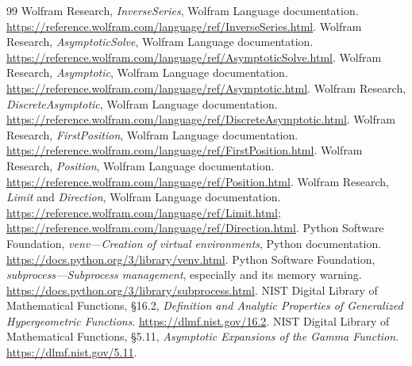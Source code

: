\documentclass[11pt,letterpaper]{article}
\newcommand{\code}[1]{\texttt{\detokenize{#1}}}
\begin{document}
\begin{thebibliography}{99}
 Wolfram Research, \emph{InverseSeries}, Wolfram Language documentation. \url{https://reference.wolfram.com/language/ref/InverseSeries.html}.
 Wolfram Research, \emph{AsymptoticSolve}, Wolfram Language documentation. \url{https://reference.wolfram.com/language/ref/AsymptoticSolve.html}.
 Wolfram Research, \emph{Asymptotic}, Wolfram Language documentation. \url{https://reference.wolfram.com/language/ref/Asymptotic.html}.
 Wolfram Research, \emph{DiscreteAsymptotic}, Wolfram Language documentation. \url{https://reference.wolfram.com/language/ref/DiscreteAsymptotic.html}.
 Wolfram Research, \emph{FirstPosition}, Wolfram Language documentation. \url{https://reference.wolfram.com/language/ref/FirstPosition.html}.
 Wolfram Research, \emph{Position}, Wolfram Language documentation. \url{https://reference.wolfram.com/language/ref/Position.html}.
 Wolfram Research, \emph{Limit} and \emph{Direction}, Wolfram Language documentation. \url{https://reference.wolfram.com/language/ref/Limit.html}; \url{https://reference.wolfram.com/language/ref/Direction.html}.
 Python Software Foundation, \emph{venv---Creation of virtual environments}, Python documentation. \url{https://docs.python.org/3/library/venv.html}.
 Python Software Foundation, \emph{subprocess---Subprocess management}, especially \code{Popen.communicate} and its memory warning. \url{https://docs.python.org/3/library/subprocess.html}.
 NIST Digital Library of Mathematical Functions, \S16.2, \emph{Definition and Analytic Properties of Generalized Hypergeometric Functions}. \url{https://dlmf.nist.gov/16.2}.
 NIST Digital Library of Mathematical Functions, \S5.11, \emph{Asymptotic Expansions of the Gamma Function}. \url{https://dlmf.nist.gov/5.11}.
\end{thebibliography}
\endgroup
\end{document}
